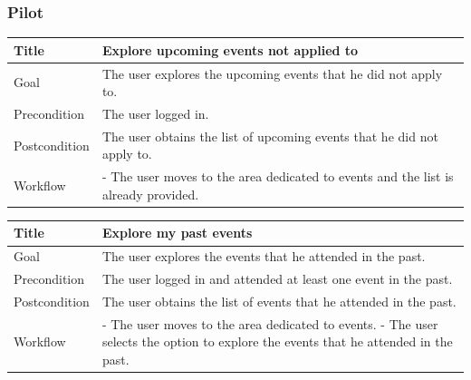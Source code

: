 \documentclass{beamer}
\begin{document}
\begin{frame}
    \frametitle{Pilot}
    \begin{table}
        \tiny
        \begin{tabular}{|p{2cm}|p{6cm}|}
        \hline
        Title & \textbf{Explore upcoming events not applied to} \\
        \hline
        Goal & The user explores the upcoming events that he did not apply to. \\
        \hline
        Precondition & The user logged in. \\
        \hline
        Postcondition & The user obtains the list of upcoming events that he did not apply to. \\
        \hline
        Workflow &
        - The user moves to the area dedicated to events and the list is already provided. \\
        \hline
        \end{tabular}
    \end{table}

    \begin{table}
        \tiny
        \begin{tabular}{|p{2cm}|p{6cm}|}
        \hline
        Title & \textbf{Explore my past events} \\
        \hline
        Goal & The user explores the events that he attended in the past. \\
        \hline
        Precondition & The user logged in and attended at least one event in the past. \\
        \hline
        Postcondition & The user obtains the list of events that he attended in the past. \\
        \hline
        Workflow &
        - The user moves to the area dedicated to events. \newline
        - The user selects the option to explore the events that he attended in the past. \\
        \hline
        \end{tabular}
    \end{table}


\end{frame}
\end{document}
